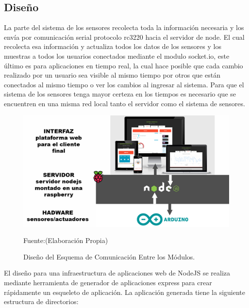 \documentclass[11pt,letterpaper]{report}
\begin{document}
		\subsection{Diseño}
		La parte del sistema de los sensores recolecta toda la información necesaria y los envía por comunicación serial protocolo rc3220 hacia el servidor  de node. El cual recolecta esa información y  actualiza todos los datos de los sensores y los muestras a todos  los usuarios conectados mediante el modulo socket.io, este último es para aplicaciones en tiempo real, la cual hace posible que cada cambio realizado por un usuario sea visible al  mismo tiempo por otros que están conectados al mismo tiempo o ver los cambios  al ingresar al sistema. Para que el sistema de los sensores tenga mayor certeza en los tiempos es necesario que se encuentren en una  misma red local tanto el servidor como el sistema de sensores.
		\begin{figure}[H]
		\centering
		\includegraphics[scale=0.9]{imagenes/arquitectura.png}
		\caption{Diseño del Esquema de Comunicación Entre los Módulos.}
		 Fuente:(Elaboración Propia)
		\label{modulos} 
		\end{figure}
El diseño para una infraestructura de aplicaciones web de NodeJS se realiza mediante herramienta de generador de aplicaciones express para crear rápidamente un esqueleto de aplicación. La aplicación generada tiene la siguiente estructura de directorios:
\end{document}
